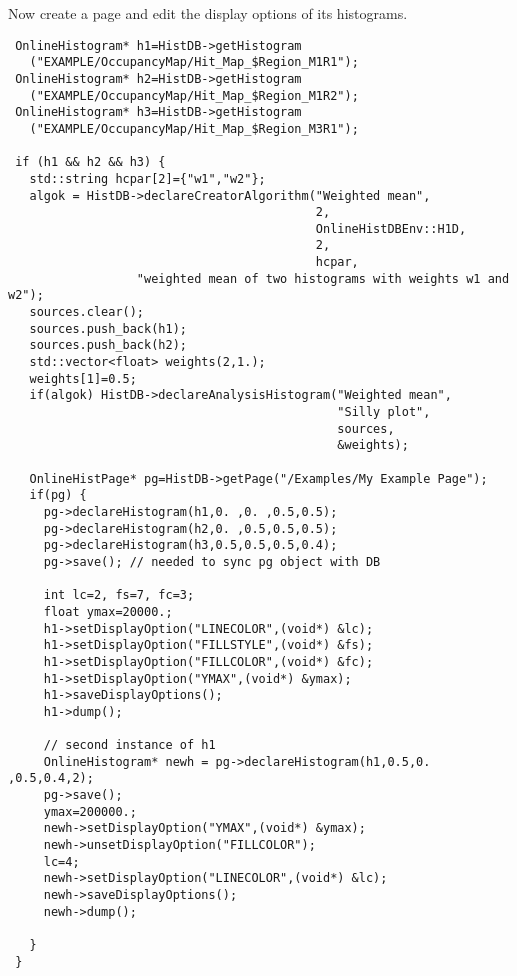\documentclass{lhcbnote}
\begin{document}
Now create a page and edit the display options of its
histograms. 
\begin{verbatim}
 OnlineHistogram* h1=HistDB->getHistogram
   ("EXAMPLE/OccupancyMap/Hit_Map_$Region_M1R1");
 OnlineHistogram* h2=HistDB->getHistogram
   ("EXAMPLE/OccupancyMap/Hit_Map_$Region_M1R2");
 OnlineHistogram* h3=HistDB->getHistogram
   ("EXAMPLE/OccupancyMap/Hit_Map_$Region_M3R1");

 if (h1 && h2 && h3) {
   std::string hcpar[2]={"w1","w2"};
   algok = HistDB->declareCreatorAlgorithm("Weighted mean",
                                           2,
                                           OnlineHistDBEnv::H1D,
                                           2,
                                           hcpar,
                  "weighted mean of two histograms with weights w1 and w2");
   sources.clear();
   sources.push_back(h1);
   sources.push_back(h2);
   std::vector<float> weights(2,1.);
   weights[1]=0.5;
   if(algok) HistDB->declareAnalysisHistogram("Weighted mean",
                                              "Silly plot",
                                              sources,
                                              &weights);

   OnlineHistPage* pg=HistDB->getPage("/Examples/My Example Page");
   if(pg) {
     pg->declareHistogram(h1,0. ,0. ,0.5,0.5);
     pg->declareHistogram(h2,0. ,0.5,0.5,0.5);
     pg->declareHistogram(h3,0.5,0.5,0.5,0.4);
     pg->save(); // needed to sync pg object with DB
   
     int lc=2, fs=7, fc=3;
     float ymax=20000.;
     h1->setDisplayOption("LINECOLOR",(void*) &lc);
     h1->setDisplayOption("FILLSTYLE",(void*) &fs);
     h1->setDisplayOption("FILLCOLOR",(void*) &fc); 
     h1->setDisplayOption("YMAX",(void*) &ymax); 
     h1->saveDisplayOptions();
     h1->dump();

     // second instance of h1
     OnlineHistogram* newh = pg->declareHistogram(h1,0.5,0. ,0.5,0.4,2);
     pg->save();
     ymax=200000.;
     newh->setDisplayOption("YMAX",(void*) &ymax); 
     newh->unsetDisplayOption("FILLCOLOR");
     lc=4;
     newh->setDisplayOption("LINECOLOR",(void*) &lc);
     newh->saveDisplayOptions();
     newh->dump();

   }
 }
\end{verbatim}
\end{document}
